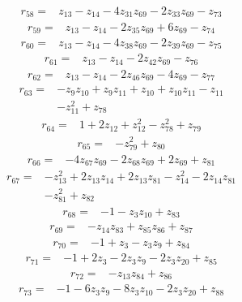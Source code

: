 \begin{align*}
r_{58}={}&z_{13} -z_{14} -4z_{31}z_{69} -2z_{33}z_{69} -z_{73}
\end{align*}
\begin{align*}
r_{59}={}&z_{13} -z_{14} -2z_{35}z_{69} +6z_{69} -z_{74}
\end{align*}
\begin{align*}
r_{60}={}&z_{13} -z_{14} -4z_{38}z_{69} -2z_{39}z_{69} -z_{75}
\end{align*}
\begin{align*}
r_{61}={}&z_{13} -z_{14} -2z_{42}z_{69} -z_{76}
\end{align*}
\begin{align*}
r_{62}={}&z_{13} -z_{14} -2z_{46}z_{69} -4z_{69} -z_{77}
\end{align*}
\begin{align*}
r_{63}={}&-z_{9}z_{10} +z_{9}z_{11} +z_{10} +z_{10}z_{11} -z_{11}\\
&-z_{11}^{2} +z_{78}
\end{align*}
\begin{align*}
r_{64}={}&1 +2z_{12} +z_{12}^{2} -z_{78}^{2} +z_{79}
\end{align*}
\begin{align*}
r_{65}={}&-z_{79}^{2} +z_{80}
\end{align*}
\begin{align*}
r_{66}={}&-4z_{67}z_{69} -2z_{68}z_{69} +2z_{69} +z_{81}
\end{align*}
\begin{align*}
r_{67}={}&-z_{13}^{2} +2z_{13}z_{14} +2z_{13}z_{81} -z_{14}^{2} -2z_{14}z_{81}\\
&-z_{81}^{2} +z_{82}
\end{align*}
\begin{align*}
r_{68}={}&-1 -z_{3}z_{10} +z_{83}
\end{align*}
\begin{align*}
r_{69}={}&-z_{14}z_{83} +z_{85}z_{86} +z_{87}
\end{align*}
\begin{align*}
r_{70}={}&-1 +z_{3} -z_{3}z_{9} +z_{84}
\end{align*}
\begin{align*}
r_{71}={}&-1 +2z_{3} -2z_{3}z_{9} -2z_{3}z_{20} +z_{85}
\end{align*}
\begin{align*}
r_{72}={}&-z_{13}z_{84} +z_{86}
\end{align*}
\begin{align*}
r_{73}={}&-1 -6z_{3}z_{9} -8z_{3}z_{10} -2z_{3}z_{20} +z_{88}
\end{align*}
